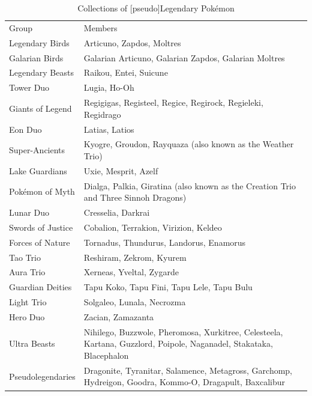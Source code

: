 \begin{table}
\footnotesize
\centering
\begin{tabular}{lp{}}
Group & Members\\
\Midrule
Legendary Birds & Articuno, Zapdos, Moltres\\
Galarian Birds & Galarian Articuno, Galarian Zapdos, Galarian Moltres\\
Legendary Beasts & Raikou, Entei, Suicune\\
Tower Duo & Lugia, Ho-Oh\\
Giants of Legend & Regigigas, Registeel, Regice, Regirock, Regieleki, Regidrago\\
Eon Duo & Latias, Latios\\
Super-Ancients & Kyogre, Groudon, Rayquaza (also known as the Weather Trio)\\
Lake Guardians & Uxie, Mesprit, Azelf\\
Pokémon of Myth & Dialga, Palkia, Giratina (also known as the Creation Trio and Three Sinnoh Dragons)\\
Lunar Duo & Cresselia, Darkrai\\
Swords of Justice & Cobalion, Terrakion, Virizion, Keldeo\\
Forces of Nature & Tornadus, Thundurus, Landorus, Enamorus\\
Tao Trio & Reshiram, Zekrom, Kyurem\\
Aura Trio & Xerneas, Yveltal, Zygarde\\
Guardian Deities & Tapu Koko, Tapu Fini, Tapu Lele, Tapu Bulu\\
Light Trio & Solgaleo, Lunala, Necrozma\\
Hero Duo & Zacian, Zamazanta\\
Ultra Beasts & Nihilego, Buzzwole, Pheromosa, Xurkitree, Celesteela, Kartana, Guzzlord,
               Poipole, Naganadel, Stakataka, Blacephalon \\
Pseudolegendaries & Dragonite, Tyranitar, Salamence, Metagross, Garchomp, Hydreigon, Goodra, Kommo-O, Dragapult, Baxcalibur\\
\end{tabular}
  \caption{Collections of [pseudo]Legendary Pokémon\label{table:namedmyths}}
\end{table}

%
